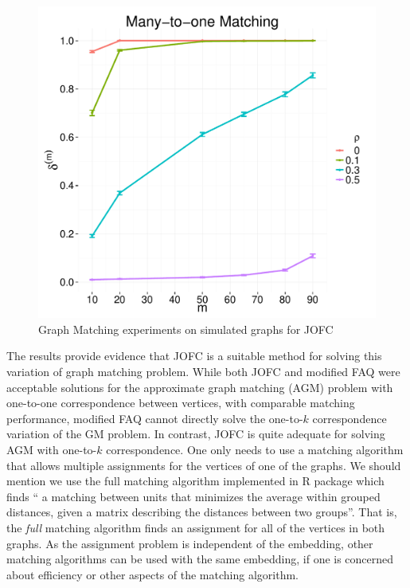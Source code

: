 \documentclass[12pt,oneside,final]{thesis}
\begin{document}
\begin{figure}
\includegraphics[scale=0.65]{Total_precision_JOFC_1_to_k_match_paper.pdf}
\caption{Graph Matching experiments on simulated graphs for JOFC \label{1_k_graphmatch_sim}}
\end{figure}

The results provide evidence that JOFC is a suitable method for solving this variation of graph matching problem. While  both JOFC and modified FAQ were acceptable solutions for the approximate graph matching (AGM) problem with one-to-one correspondence between vertices, with comparable matching performance, modified FAQ  cannot directly solve  the one-to-$k$ correspondence variation of the GM problem. In contrast, JOFC is quite adequate for solving AGM with one-to-$k$ correspondence. One only needs to use a matching algorithm that allows multiple assignments for the vertices of one of the graphs. We should mention we use the full matching algorithm implemented in R package \cite{optmatch} which finds  `` a matching between units that minimizes the average within grouped distances, given a matrix describing the distances between two groups''\cite{optmatch_manual}. That is, the \emph{full} matching algorithm finds an assignment for all of the vertices in both graphs. As the assignment problem is independent of the embedding, other matching algorithms can be used with the same embedding, if one is concerned about efficiency or other aspects of the matching algorithm.
\end{document}
